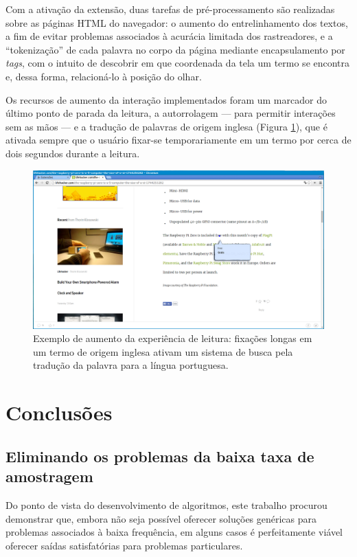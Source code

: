 \documentclass[12pt]{article}
\begin{document}
		
		Com a ativação da extensão, duas tarefas de pré-processamento são realizadas sobre as páginas HTML do navegador: o aumento do entrelinhamento dos textos, a fim de evitar problemas associados à acurácia limitada dos rastreadores, e a ``tokenização'' de cada palavra no corpo da página mediante encapsulamento por \textit{tags}, com o intuito de descobrir em que coordenada da tela um termo se encontra e, dessa forma, relacioná-lo à posição do olhar.
		
		Os recursos de aumento da interação implementados foram um marcador do último ponto de parada da leitura, a autorrolagem --- para permitir interações sem as mãos --- e a tradução de palavras de origem inglesa (Figura \ref{fig:pocface2}), que é ativada sempre que o usuário fixar-se temporariamente em um termo por cerca de dois segundos durante a leitura.
		
		\begin{figure}[!ht]
			\centering
			\includegraphics[width=16cm]{imgs/poc_balao.png}
			\caption{\footnotesize {Exemplo de aumento da experiência de leitura: fixações longas em um termo de origem inglesa ativam um sistema de busca pela tradução da palavra para a língua portuguesa.}}
			\label{fig:pocface2}
			\vspace{5mm}
		\end{figure}
		
		

		
		
		\clearpage
	\section{Conclusões}
	
		\subsection{Eliminando os problemas da baixa taxa de amostragem}
		Do ponto de vista do desenvolvimento de algoritmos, este trabalho procurou demonstrar que, embora não seja possível oferecer soluções genéricas para problemas associados à baixa frequência, em alguns casos é perfeitamente viável oferecer saídas satisfatórias para problemas particulares.
		
\end{document}
